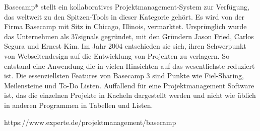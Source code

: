 Basecamp* stellt ein kollaboratives Projektmanagement-System zur Verfügung, das weltweit zu den Spitzen-Tools in dieser Kategorie gehört. Es wird von der Firma Basecamp mit Sitz in Chicago, Illinois, vermarktet. Ursprünglich wurde das Unternehmen als 37signals gegründet, mit den Gründern Jason Fried, Carlos Segura und Ernest Kim. Im Jahr 2004 entschieden sie sich, ihren Schwerpunkt von Webseitendesign auf die Entwicklung von Projekten zu verlagern.
So entstand eine Anwendung die in vielen Hinsichten auf das wesentlichste reduziert ist. Die essenziellsten Features von Basecamp 3 sind Punkte wie Fiel-Sharing, Meilensteine und To-Do Listen. Auffallend für eine Projektmanagement Software ist, das die einzelnen Projekte in Kacheln dargestellt werden und nicht wie üblich in anderen Programmen in Tabellen und Listen.





https://www.experte.de/projektmanagement/basecamp